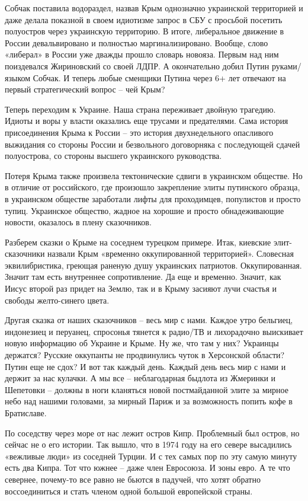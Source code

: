 Собчак поставила водораздел, назвав Крым однозначно украинской территорией и
даже делала показной в своем идиотизме запрос в СБУ с просьбой посетить
полуостров через украинскую территорию. В итоге, либеральное движение в России
девальвировано и полностью маргинализировано. Вообще, слово «либерал» в России
уже дважды прошло словарь новояза. Первым над ним поиздевался Жириновский со
своей ЛДПР. А окончательно добил Путин руками/языком Собчак. И теперь любые
сменщики Путина через 6+ лет отвечают на первый стратегический вопрос – чей
Крым?

Теперь переходим к Украине. Наша страна переживает двойную трагедию. Идиоты и
воры у власти оказались еще трусами и предателями. Сама история присоединения
Крыма к России – это история двухнедельного опасливого выжидания со стороны
России и безвольного договорняка с последующей сдачей полуострова, со стороны
высшего украинского руководства.

Потеря Крыма также произвела тектонические сдвиги в украинском обществе. Но в
отличие от российского, где произошло закрепление элиты путинского образца, в
украинском обществе заработали лифты для проходимцев, популистов и просто
тупиц. Украинское общество, жадное на хорошие и просто обнадеживающие новости,
оказалось в плену сказочников.

Разберем сказки о Крыме на соседнем турецком примере. Итак, киевские
элит-сказочники назвали Крым «временно оккупированной территорией». Словесная
эквилибристика, греющая раненую душу украинских патриотов. Оккупированная.
Значит там есть внутреннее сопротивление. Да еще и временно. Значит, как Иисус
второй раз придет на Землю, так и в Крыму засияют лучи счастья и свободы
желто-синего цвета.

Другая сказка от наших сказочников – весь мир с нами. Каждое утро бельгиец,
индонезиец и перуанец, спросонья тянется к радио/ТВ и лихорадочно выискивает
новую информацию об Украине и Крыме. Ну же, что там у них? Украинцы держатся?
Русские оккупанты не продвинулись чуток в Херсонской области? Путин еще не
сдох? И вот так каждый день. Каждый день весь мир с нами и держит за нас
кулачки. А мы все – неблагодарная быдлота из Жмеринки и Шепетовки – должны в
ноги кланяться новой постмайданной элите за мирное небо над нашими головами, за
мирный Париж и за возможность попить кофе в Братиславе.

По соседству через море от нас лежит остров Кипр. Проблемный был остров, но
сейчас не о его истории. Так вышло, что в 1974 году на его севере высадились
«вежливые люди» из соседней Турции. И с тех самых пор по эту самую минуту есть
два Кипра. Тот что южнее – даже член Евросоюза. И зоны евро. А те что севернее,
почему-то все равно не бьются в падучей, что хотят обратно воссоединиться и
стать членом одной большой европейской страны.

